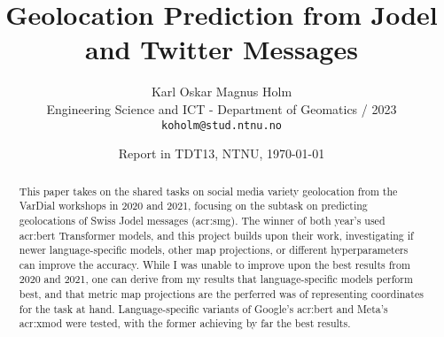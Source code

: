 \documentclass[11pt]{article}
\title{Geolocation Prediction from Jodel and Twitter Messages}
\author{Karl Oskar Magnus Holm \\
  Engineering Science and ICT - Department of Geomatics / 2023 \\
  {\tt koholm@stud.ntnu.no} \\}
\date{Report in TDT13, NTNU, \today}
\begin{document}
\maketitle


\begin{abstract}
    \begin{comment}
    This paper provides a template for writing a Project Report in TDT13, Advanced Text Analytics and Language Understanding.
    The document itself conforms to its own specifications and is thus an example of what your manuscript should look like.
    The template does not form a compulsory style that you are obliged to use, but rather provides a common starting point for all students.
    For a given report, tuning of the template may still be required, depending on the nature of the report and the author's writing style.
    Such tuning might involve moving a section to a subsection or vice versa, or removing or adding sections and subsections.

    Note that the template contains a lot of examples of how to write different parts of the report
    as well as how to cite authors and how to use LaTeX and BibTeX.
    Some of those examples might only be clear if you actually look at the LaTeX source itself.

    The abstract is your sales pitch which encourages people to read your work,
    but unlike sales it should be realistic with respect to the contributions of the work.
    It should include:
    \begin{itemize}
        \item what the research topic is,
        \item the research approach(es) applied, and
        \item contributions.
    \end{itemize}

    The abstract should not exceed 200 words.
    Do not include lists, tables or figures.
    Avoid abbreviations and references.
    \end{comment}

    This paper takes on the shared tasks on social media variety geolocation from the VarDial workshops in 2020 and 2021, focusing on the subtask on predicting geolocations of Swiss Jodel messages (\acrlong{acr:smg}). The winner of both year's used \acrshort{acr:bert} Transformer models, and this project builds upon their work, investigating if newer language-specific models, other map projections, or different hyperparameters can improve the accuracy. While I was unable to improve upon the best results from 2020 and 2021, one can derive from my results that language-specific models perform best, and that metric map projections are the perferred was of representing coordinates for the task at hand. Language-specific variants of Google's \acrshort{acr:bert} and Meta's \acrshort{acr:xmod} were tested, with the former achieving by far the best results.
\end{abstract}
\end{document}
